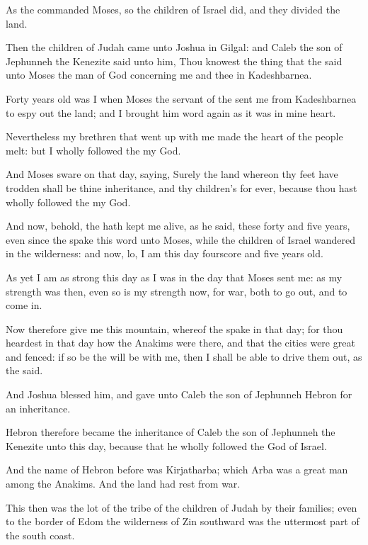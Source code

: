 \Verse As the \LORD commanded Moses, so the children of Israel did, and they divided the land.

\Verse Then the children of Judah came unto Joshua in Gilgal: and Caleb the son of Jephunneh the Kenezite said unto him, Thou knowest the thing that the \LORD said unto Moses the man of God concerning me and thee in Kadeshbarnea.

\Verse Forty years old was I when Moses the servant of the \LORD sent me from Kadeshbarnea to espy out the land; and I brought him word again as it was in mine heart.

\Verse Nevertheless my brethren that went up with me made the heart of the people melt: but I wholly followed the \LORD my God.

\Verse And Moses sware on that day, saying, Surely the land whereon thy feet have trodden shall be thine inheritance, and thy children's for ever, because thou hast wholly followed the \LORD my God.

\Verse And now, behold, the \LORD hath kept me alive, as he said, these forty and five years, even since the \LORD spake this word unto Moses, while the children of Israel wandered in the wilderness: and now, lo, I am this day fourscore and five years old.

\Verse As yet I am as strong this day as I was in the day that Moses sent me: as my strength was then, even so is my strength now, for war, both to go out, and to come in.

\Verse Now therefore give me this mountain, whereof the \LORD spake in that day; for thou heardest in that day how the Anakims were there, and that the cities were great and fenced: if so be the \LORD will be with me, then I shall be able to drive them out, as the \LORD said.

\Verse And Joshua blessed him, and gave unto Caleb the son of Jephunneh Hebron for an inheritance.

\Verse Hebron therefore became the inheritance of Caleb the son of Jephunneh the Kenezite unto this day, because that he wholly followed the \LORD God of Israel.

\Verse And the name of Hebron before was Kirjatharba; which Arba was a great man among the Anakims. And the land had rest from war.


\Chapter
\Verse This then was the lot of the tribe of the children of Judah by their families; even to the border of Edom the wilderness of Zin southward was the uttermost part of the south coast.

